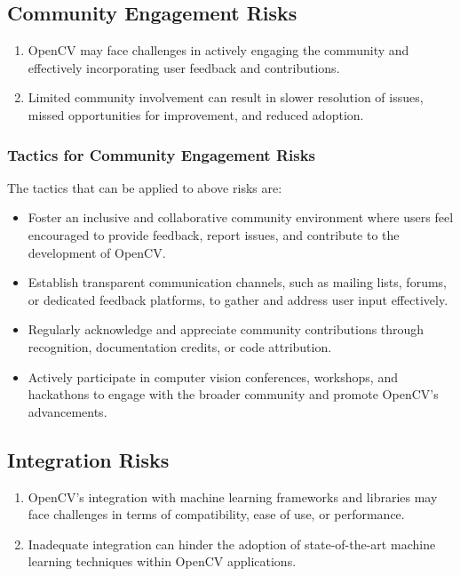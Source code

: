 \subsection{Community Engagement Risks \label{subSection::CommunityRisk}}
\begin{enumerate}
     \item OpenCV may face challenges in actively engaging the community and effectively incorporating user feedback and contributions.
     \item Limited community involvement can result in slower resolution of issues, missed opportunities for improvement, and reduced adoption.
 \end{enumerate}

 \subsubsection{Tactics for Community Engagement Risks \label{subsubSection::CommunityTactic}}
The tactics that can be applied to above risks are:
\begin{itemize}
     \item Foster an inclusive and collaborative community environment where users feel encouraged to provide feedback, report issues, and contribute to the development of OpenCV.
     \item Establish transparent communication channels, such as mailing lists, forums, or dedicated feedback platforms, to gather and address user input effectively.
     \item Regularly acknowledge and appreciate community contributions through recognition, documentation credits, or code attribution.
     \item Actively participate in computer vision conferences, workshops, and hackathons to engage with the broader community and promote OpenCV's advancements.
\end{itemize}

\subsection{Integration Risks \label{subSection::IntegrationRisk}}
\begin{enumerate}
     \item OpenCV's integration with machine learning frameworks and libraries may face challenges in terms of compatibility, ease of use, or performance.
     \item Inadequate integration can hinder the adoption of state-of-the-art machine learning techniques within OpenCV applications.
 \end{enumerate}
